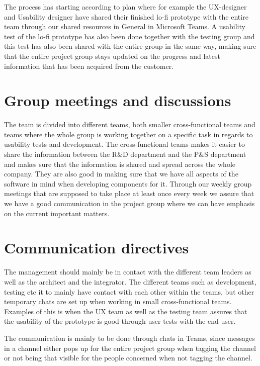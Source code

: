 \documentclass[12pt]{article}
\begin{document}
 The process has starting according to plan where for example the UX-designer and Usability designer have shared their finished lo-fi prototype with the entire team through our shared resources in General in Microsoft Teams. A usability test of the lo-fi prototype has also been done together with the testing group and this test has also been shared with the entire group in the same way, making sure that the entire project group stays updated on the progress and latest information that has been acquired from the customer. 
 
    \section{Group meetings and discussions}
The team is divided into different teams, both smaller cross-functional teams and teams where the whole group is working together on a specific task in regards to usability tests and development. The cross-functional teams makes it easier to share the information between the R\&D department and the P\&S department and makes sure that the information is shared and spread across the whole company. They are also good in making sure that we have all aspects of the software in mind when developing components for it. Through our weekly group meetings that are supposed to take place at least once every week we assure that we have a good communication in the project group where we can have emphasis on the current important matters.

    \section{Communication directives}


The management should mainly be in contact with the different team leaders as well as the architect and the integrator. The different teams such as development, testing etc it to mainly have contact with each other within the teams, but other temporary chats are set up when working in small cross-functional teams. Examples of this is when the UX team as well as the testing team assures that the usability of the prototype is good through user tests with the end user. 

The communication is mainly to be done through chats in Teams, since messages in a channel either pops up for the entire project group when tagging the channel or not being that visible for the people concerned when not tagging the channel. 
\end{document}

